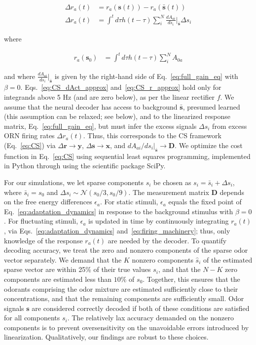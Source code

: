 \documentclass[9pt,lineno]{elife}
\begin{document}
\begin{align}
\Delta r_a(t) &= r_a(\mathbf s(t)) - r_a(\bar{\mathbf s}(t)) \nonumber \\
\Delta r_a(t) &= \int^t d\tau h(t- \tau)\sum_i^N\frac{dA_{ai}}{ds_i}\bigg|_{\bar{\mathbf s}}\Delta s_i \label{eq:CS_dAct_approx}
\end{align}

where 

\begin{align}
r_a(\mathbf s_0) &= \int^t d\tau h(t- \tau)\sum_i^NA_{0a} 
\label{eq:CS_r_approx} 
\end{align}

and where $\frac{dA_{ai}}{ds_i}\big|_{\bar{\mathbf s}}$ is given by the right-hand side of Eq.~\ref{eq:full_gain_eq} with $\beta = 0$. Eqs.~\ref{eq:CS_dAct_approx} and~\ref{eq:CS_r_approx} hold only for integrands above 5 Hz (and are zero below), as per the linear rectifier $f$. We assume that the neural decoder has access to background $\bar{\mathbf s}$, presumed learned (this assumption can be relaxed; see below), and to  the linearized response matrix, Eq.~\ref{eq:full_gain_eq}, but must infer the excess signals $\Delta s_i$ from excess ORN firing rates $\Delta r_a(t)$. Thus, this corresponds to the CS framework (Eq.~\ref{eq:CS})  via $\Delta \mathbf {r} \rightarrow \mathbf y$, $\Delta \mathbf s \rightarrow \mathbf x$, and $dA_{ai}/{ds_i}\big|_{\bar {\mathbf s}} \rightarrow \mathbf D$. We optimize the cost function in Eq.~\ref{eq:CS} using sequential least squares programming, implemented in Python through using the scientific package SciPy. 



For our simulations, we let sparse components $s_i$ be chosen as $s_i = \bar s_i + \Delta s_i$, where $\bar s_i= s_0$ and $\Delta s_i \sim \mathcal {N} (s_0/3, s_0/9)$. The measurement matrix $\mathbf D$ depends on the free energy differences $\epsilon_a$. For static stimuli, $\epsilon_a$ equals the fixed point of Eq.~\ref{eq:adaptation_dynamics} in response to the background stimulus with $\beta = 0$. For fluctuating stimuli, $\epsilon_a$ is updated in time by continuously integrating  $r_a(t)$, via Eqs.~\ref{eq:adaptation_dynamics} and~\ref{eq:firing_machinery}; thus, only knowledge of the response $r_a(t)$ are needed by the decoder. To quantify decoding accuracy, we treat the zero and nonzero components of the sparse odor vector separately. We demand that the $K$ nonzero components $\hat s_i$ of the estimated sparse vector are within 25\% of their true values $s_i$, and that the $N - K$ zero components are estimated less than $10\%$ of $s_0$. Together, this ensures that the odorants comprising the odor mixture are estimated sufficiently close to their concentrations, and that the remaining components are sufficiently small. Odor signals $\mathbf s$ are considered correctly decoded if both of these conditions are satisfied for all components $s_i$. The relatively lax accuracy demanded on the nonzero components is to prevent oversensitivity on the unavoidable errors introduced by linearization. Qualitatively, our findings are robust to these choices. 
\end{document}
